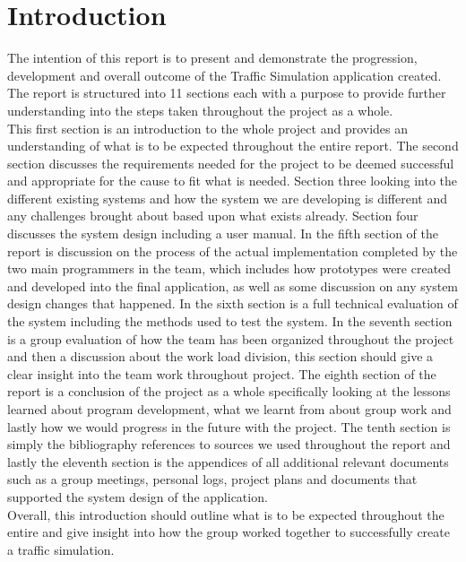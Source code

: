 \documentclass[11pt]{article}
\begin{document}
	\section{Introduction} %
	The intention of this report is to present and demonstrate the progression, development and overall outcome of the Traffic Simulation application created. The report is structured into 11 sections each with a purpose to provide further understanding into the steps taken throughout the project as a whole. 
	\\ This first section is an introduction to the whole project and provides an understanding of what is to be expected throughout the entire report. The second section discusses the requirements needed for the project to be deemed successful and appropriate for the cause to fit what is needed. Section three looking into the different existing systems and how the system we are developing is different and any challenges brought about based upon what exists already. Section four discusses the system design including a user manual. In the fifth section of the report is discussion on the process of the actual implementation completed by the two main programmers in the team, which includes how prototypes were created and developed into the final application, as well as some discussion on any system design changes that happened. In the sixth section is a full technical evaluation of the system including the methods used to test the system. In the seventh section is a group evaluation of how the team has been organized throughout the project and then a discussion about the work load division, this section should give a clear insight into the team work throughout project. The eighth section of the report is a conclusion of the project as a whole specifically looking at the lessons learned about program development, what we learnt from about group work and lastly how we would progress in the future with the project. The tenth section is simply the bibliography references to sources we used throughout the report and lastly the eleventh section is the appendices of all additional relevant documents such as a group meetings, personal logs, project plans and documents that supported the system design of the application.\\
	Overall, this introduction should outline what is to be expected throughout the entire and give insight into how the group worked together to successfully create a traffic simulation.
	
\end{document}
